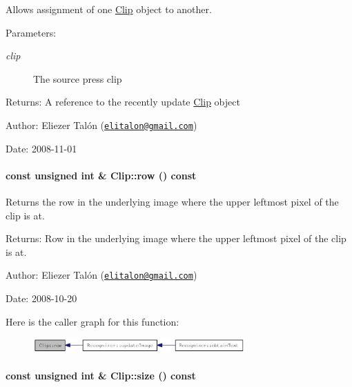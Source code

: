Allows assignment of one \hyperlink{class_clip}{Clip} object to another. 

\begin{Desc}
\item[Parameters:]
\begin{description}
\item[{\em clip}]The source press clip\end{description}
\end{Desc}
\begin{Desc}
\item[Returns:]A reference to the recently update \hyperlink{class_clip}{Clip} object\end{Desc}
\begin{Desc}
\item[Author:]Eliezer Talón (\href{mailto:elitalon@gmail.com}{\tt elitalon@gmail.com}) \end{Desc}
\begin{Desc}
\item[Date:]2008-11-01 \end{Desc}
\hypertarget{class_clip_1a1d1fd626d1325f0f2b9184de4c89b8}{
\paragraph[{row}]{\setlength{\rightskip}{0pt plus 5cm}const unsigned int \& Clip::row () const}\hfill}
\label{class_clip_1a1d1fd626d1325f0f2b9184de4c89b8}


Returns the row in the underlying image where the upper leftmost pixel of the clip is at. 

\begin{Desc}
\item[Returns:]Row in the underlying image where the upper leftmost pixel of the clip is at.\end{Desc}
\begin{Desc}
\item[Author:]Eliezer Talón (\href{mailto:elitalon@gmail.com}{\tt elitalon@gmail.com}) \end{Desc}
\begin{Desc}
\item[Date:]2008-10-20 \end{Desc}


Here is the caller graph for this function:\nopagebreak
\begin{figure}[H]
\begin{center}
\leavevmode
\includegraphics[width=230pt]{class_clip_1a1d1fd626d1325f0f2b9184de4c89b8_icgraph}
\end{center}
\end{figure}
\hypertarget{class_clip_eb6b12a1a0570b529d6a09633b991fcd}{
\paragraph[{size}]{\setlength{\rightskip}{0pt plus 5cm}const unsigned int \& Clip::size () const}\hfill}
\label{class_clip_eb6b12a1a0570b529d6a09633b991fcd}


